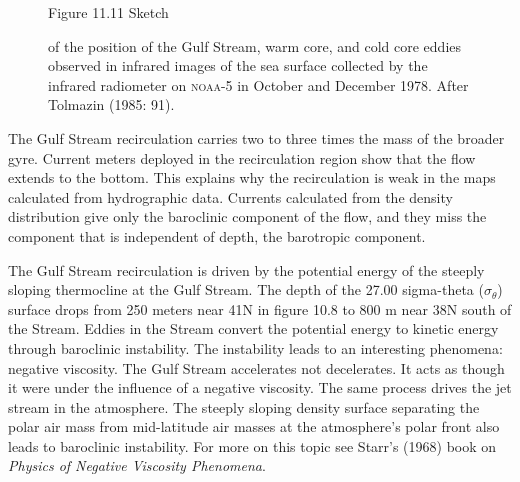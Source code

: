 \begin{figure}[t!]
\footnotesize
Figure 11.11 Sketch \rule{0mm}{3ex}of the position of the Gulf
Stream, warm core, and cold core eddies
observed in infrared images of the sea surface collected by the
infrared radiometer on \textsc{noaa}-5 in October and December
1978. After Tolmazin (1985: 91).

\label{fig:ringsmap}
\vspace{-4ex}
\end{figure}

The Gulf Stream recirculation carries two to three times the mass of
the broader gyre. Current meters deployed in the recirculation region
show that the flow extends to the bottom. This explains why the
recirculation is weak in the maps calculated from hydrographic
data. Currents calculated
from the density distribution give only the baroclinic component of
the flow, and they miss the component that is independent of depth,
the barotropic component.

The Gulf Stream recirculation is driven by the potential energy of the
steeply sloping thermocline at
the Gulf Stream. The depth of the 27.00 sigma-theta
($\sigma_{\theta}$) surface drops from 250 meters near 41\degrees N in
figure 10.8 to 800 m near 38\degrees N south of the Stream. Eddies in
the Stream convert the potential energy to kinetic energy through
baroclinic instability. The instability leads to an interesting
phenomena: negative viscosity. The Gulf Stream accelerates not
decelerates. It acts as though it were under the influence of a
negative viscosity. The same process drives the jet stream in the
atmosphere. The steeply sloping density surface separating the polar
air mass from mid-latitude air masses at the atmosphere's polar front
also leads to baroclinic instability. For more on this topic see
Starr's (1968) book on \textit{Physics of Negative Viscosity
  Phenomena}.

